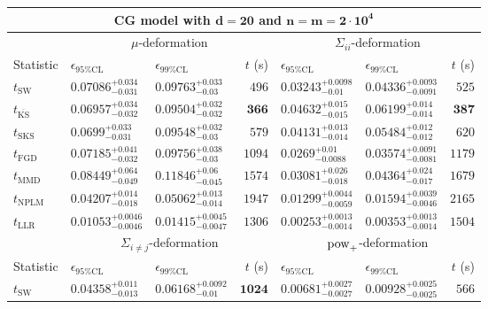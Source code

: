 \begin{tabular}{l|llr|llr}
	\toprule
	\multicolumn{7}{c}{{\bf CG model with $\mathbf{d=20}$ and $\mathbf{n=m=2\cdot 10^{4}}$}} \\
	\toprule
	\multicolumn{1}{c}{} & \multicolumn{3}{c}{$\mu$-deformation} & \multicolumn{3}{c}{$\Sigma_{ii}$-deformation} \\
	Statistic & $\epsilon_{95\%\mathrm{CL}}$ & $\epsilon_{99\%\mathrm{CL}}$ & $t$ (s) & $\epsilon_{95\%\mathrm{CL}}$ & $\epsilon_{99\%\mathrm{CL}}$ & $t$ (s) \\
	\midrule
	$t_{\mathrm{SW}}$ & $0.07086_{-0.031}^{+0.034}$ & $0.09763_{-0.03}^{+0.033}$ & $496$ & $0.03243_{-0.01}^{+0.0098}$ & $0.04336_{-0.0091}^{+0.0093}$ & $525$ \\
	$t_{\overline{\mathrm{KS}}}$ & ${\mathbf{0.06957_{-0.032}^{+0.034}}}$ & ${\mathbf{0.09504_{-0.032}^{+0.032}}}$ & ${\mathbf{366}}$ & $0.04632_{-0.015}^{+0.015}$ & $0.06199_{-0.014}^{+0.014}$ & ${\mathbf{387}}$ \\
	$t_{\mathrm{SKS}}$ & $0.0699_{-0.031}^{+0.033}$ & $0.09548_{-0.03}^{+0.032}$ & $579$ & $0.04131_{-0.014}^{+0.013}$ & $0.05484_{-0.012}^{+0.012}$ & $620$ \\
	$t_{\mathrm{FGD}}$ & $0.07185_{-0.032}^{+0.041}$ & $0.09756_{-0.03}^{+0.038}$ & $1094$ & ${\mathbf{0.0269_{-0.0088}^{+0.01}}}$ & ${\mathbf{0.03574_{-0.0081}^{+0.0091}}}$ & $1179$ \\
	$t_{\mathrm{MMD}}$ & $0.08449_{-0.049}^{+0.064}$ & $0.11846_{-0.045}^{+0.06}$ & $1574$ & $0.03081_{-0.018}^{+0.026}$ & $0.04364_{-0.017}^{+0.024}$ & $1679$ \\
\rowcolor{red!35}	$t_{\mathrm{NPLM}}$ & $0.04207_{-0.018}^{+0.014}$ & $0.05062_{-0.014}^{+0.013}$ & $1947$ & $0.01299_{-0.0059}^{+0.0044}$ & $0.01594_{-0.0046}^{+0.0039}$ & $2165$ \\
	$t_{\mathrm{LLR}}$ & $0.01053_{-0.0046}^{+0.0046}$ & $0.01415_{-0.0047}^{+0.0045}$ & $1306$ & $0.00253_{-0.0014}^{+0.0013}$ & $0.00353_{-0.0014}^{+0.0013}$ & $1504$ \\
	\toprule
	\multicolumn{1}{c}{} & \multicolumn{3}{c}{$\Sigma_{i\neq j}$-deformation} & \multicolumn{3}{c}{$\rm{pow}_{+}$-deformation} \\
	Statistic & $\epsilon_{95\%\mathrm{CL}}$ & $\epsilon_{99\%\mathrm{CL}}$ & $t$ (s) & $\epsilon_{95\%\mathrm{CL}}$ & $\epsilon_{99\%\mathrm{CL}}$ & $t$ (s) \\
	\midrule
	$t_{\mathrm{SW}}$ & $0.04358_{-0.013}^{+0.011}$ & $0.06168_{-0.01}^{+0.0092}$ & ${\mathbf{1024}}$ & $0.00681_{-0.0027}^{+0.0027}$ & $0.00928_{-0.0025}^{+0.0025}$ & $566$ \\

\end{tabular}
